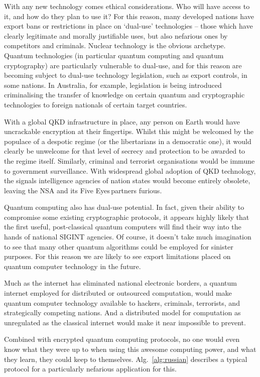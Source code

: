\documentclass[aps, rmp, twocolumn, amsmath, amssymb, nofootinbib, superscriptaddress, longbibliography, floatfix, table-of-contents, eqsecnum]{revtex4-1}
\begin{document}
With any new technology comes ethical considerations. Who will have access to it, and how do they plan to use it? For this reason, many developed nations have export bans or restrictions in place on `dual-use' technologies -- those which have clearly legitimate and morally justifiable uses, but also nefarious ones by competitors and criminals. Nuclear technology is the obvious archetype. Quantum technologies (in particular quantum computing and quantum cryptography) are particularly vulnerable to dual-use, and for this reason are becoming subject to dual-use technology legislation, such as export controls, in some nations. In Australia, for example, legislation is being introduced criminalising the transfer of knowledge on certain quantum and cryptographic technologies to foreign nationals of certain target countries.

With a global QKD infrastructure in place, any person on Earth would have uncrackable encryption at their fingertips. Whilst this might be welcomed by the populace of a despotic regime (or the libertarians in a democratic one), it would clearly be unwelcome for that level of secrecy and protection to be awarded to the regime itself. Similarly, criminal and terrorist organisations would be immune to government surveillance. With widespread global adoption of QKD technology, the signals intelligence agencies of nation states would become entirely obsolete, leaving the NSA and its Five Eyes\texttrademark \,partners furious.

Quantum computing also has dual-use potential. In fact, given their ability to compromise some existing cryptographic protocols, it appears highly likely that the first useful, post-classical quantum computers will find their way into the hands of national SIGINT agencies. Of course, it doesn't take much imagination to see that many other quantum algorithms could be employed for sinister purposes. For this reason we are likely to see export limitations placed on quantum computer technology in the future.

Much as the internet has eliminated national electronic borders, a quantum internet employed for distributed or outsourced computation, would make quantum computer technology available to hackers, criminals, terrorists, and strategically competing nations. And a distributed model for computation as unregulated as the classical internet would make it near impossible to prevent.

Combined with encrypted quantum computing protocols, no one would even know what they were up to when using this awesome computing power, and what they learn, they could keep to themselves. Alg.~\ref{alg:russian} describes a typical protocol for a particularly nefarious application for this.
\end{document}
